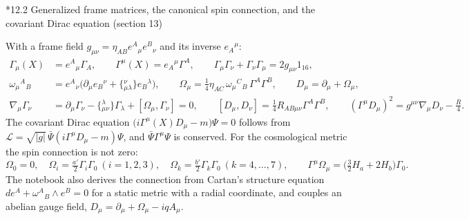 \documentclass[10pt,a4paper]{article}
\makeatletter
\renewcommand\subsection{\@startsection{subsection}{2}{\z@}{-3.25ex\@plus -1ex \@minus -.2ex}{1.5ex \@plus .2ex}{\normalfont\large\bfseries\raggedright}}
\makeatother
\begin{document}
\subsection*{12.2 Generalized frame matrices, the canonical spin connection, and the covariant Dirac equation (section 13)}
With a frame field $g_{\mu\nu}=\eta_{AB}e^A{}_\mu e^B{}_\nu$ and its inverse $e_A{}^\mu$:
\begin{align*}
\Gamma_\mu(X)&=e^A{}_\mu\Gamma_A,\qquad \Gamma^\mu(X)=e_A{}^\mu\Gamma^A,\qquad \Gamma_\mu\Gamma_\nu+\Gamma_\nu\Gamma_\mu=2g_{\mu\nu}1_{16}, \\
\omega_\mu{}^A{}_B&=e^A{}_\nu\big(\partial_\mu e_B{}^\nu+\{{}^{\nu}_{\mu\lambda}\}e_B{}^\lambda\big),\qquad \Omega_\mu=\tfrac14\eta_{AC}\,\omega_\mu{}^C{}_B\,\Gamma^A\Gamma^B,\qquad D_\mu=\partial_\mu+\Omega_\mu, \\
\nabla_\mu\Gamma_\nu&=\partial_\mu\Gamma_\nu-\{{}^{\lambda}_{\mu\nu}\}\Gamma_\lambda+[\Omega_\mu,\Gamma_\nu]=0,\qquad [D_\mu,D_\nu]=\tfrac14R_{AB\mu\nu}\Gamma^A\Gamma^B,\qquad (\Gamma^\mu D_\mu)^2=g^{\mu\nu}\nabla_\mu D_\nu-\tfrac R4 .
\end{align*}
The covariant Dirac equation $\big(i\Gamma^\mu(X)D_\mu-m\big)\Psi=0$ follows from $\mathcal L=\sqrt{|g|}\,\bar\Psi(i\Gamma^\mu D_\mu-m)\Psi$, and $\bar\Psi\Gamma^\mu\Psi$ is conserved. For the cosmological metric the spin connection is not zero:
\begin{equation*}
\Omega_0=0,\quad \Omega_i=\tfrac{a'}{2}\Gamma_i\Gamma_0\ (i=1,2,3),\quad \Omega_k=\tfrac{b'}{2}\Gamma_k\Gamma_0\ (k=4,\dots,7),\qquad \Gamma^\mu\Omega_\mu=\big(\tfrac32H_a+2H_b\big)\Gamma_0 .
\end{equation*}
The notebook also derives the connection from Cartan’s structure equation $de^A+\omega^A{}_B\wedge e^B=0$ for a static metric with a radial coordinate, and couples an abelian gauge field, $D_\mu=\partial_\mu+\Omega_\mu-iqA_\mu$.
\end{document}

